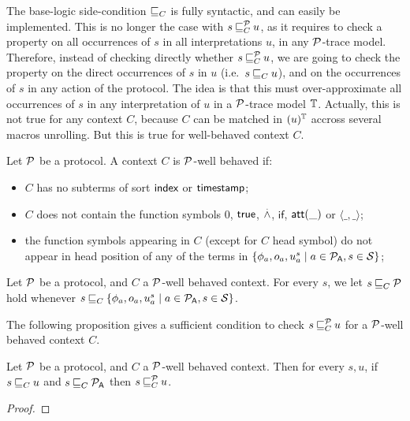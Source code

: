 The base-logic side-condition $\mathbin{\sqsubseteq}_{C}$ is fully syntactic, and can easily be implemented. This is no longer the case with $s \mathbin{\sqsubseteq}^{\mathcal{P}}_{C} u$, as it requires to check a property on all occurrences of $s$ in all interpretations $u$, in any $\mathcal{P}$-trace model. Therefore, instead of checking directly whether $s \mathbin{\sqsubseteq}^{\mathcal{P}}_{C} u$, we are going to check the property on the direct occurrences of $s$ in $u$ (i.e.\ $s \mathbin{\sqsubseteq}_{C} u$), and on the occurrences of $s$ in any action of the protocol. The idea is that this must over-approximate all occurrences of $s$ in any interpretation of $u$ in a $\mathcal{P}$-trace model $\mathbb{T}$. Actually, this is not true for any context $C$, because $C$ can be matched in $(u)^{\mathbb{T}}$ accross several macros unrolling. But this is true for well-behaved context $C$. 

\begin{definition}
  Let $\mathcal{P}$ be a protocol. A context $C$ is $\mathcal{P}$-well behaved if:
  \begin{itemize}
  \item $C$ has no subterms of sort $\textsf{index}$ or $\textsf{timestamp}$;
  \item $C$ does not contain the function symbols $0$, $\textsf{true}$, $\stackrel{.}{\wedge}$, $\mathsf{if}$, $\mathsf{att}(\_)$ or $\langle \_,\_\rangle$;
  \item the function symbols appearing in $C$ (except for $C$ head symbol) do not appear in head position of any of the terms in $\{\phi_a,o_a,u^s_a \mid a \in \mathcal{P}_{\textsf{A}}, s \in\mathcal{S}\}$;
  \end{itemize}
\end{definition}

\begin{definition}
  Let $\mathcal{P}$ be a protocol, and $C$ a $\mathcal{P}$-well behaved context. For every $s$, we let $s \mathbin{\sqsubseteq}_{C} \mathcal{P}$ hold whenever $s \mathbin{\sqsubseteq}_{C} \{\phi_a,o_a,u^s_a \mid a \in \mathcal{P}_{\textsf{A}}, s \in\mathcal{S}\}$.
\end{definition}

The following proposition gives a sufficient condition to check $s \mathbin{\sqsubseteq}^{\mathcal{P}}_{C} u$ for a $\mathcal{P}$-well behaved context $C$.

\begin{proposition}
  Let $\mathcal{P}$ be a protocol, and $C$ a $\mathcal{P}$-well behaved context. Then for every $s,u$, if $s \mathbin{\sqsubseteq}_{C} u$ and $s \mathbin{\sqsubseteq}_{C} \mathcal{P}_{\textsf{A}}$ then $s \mathbin{\sqsubseteq}^{\mathcal{P}}_{C} u$.
\end{proposition}

\begin{proof}
\end{proof}

